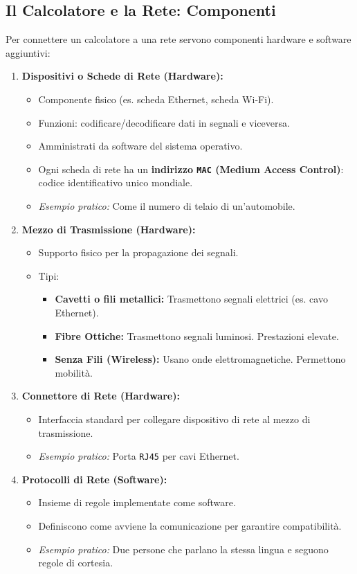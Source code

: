 \documentclass{article}
\begin{document}
\subsection{Il Calcolatore e la Rete: Componenti}
Per connettere un calcolatore a una rete servono componenti hardware e software aggiuntivi:
\begin{enumerate}
    \item \textbf{Dispositivi o Schede di Rete (Hardware):}
    \begin{itemize}
        \item Componente fisico (es. scheda Ethernet, scheda Wi-Fi).
        \item Funzioni: codificare/decodificare dati in segnali e viceversa.
        \item Amministrati da software del sistema operativo.
        \item Ogni scheda di rete ha un \textbf{indirizzo \texttt{MAC} (Medium Access Control)}: codice identificativo unico mondiale.
        \item \textit{Esempio pratico:} Come il numero di telaio di un'automobile.
    \end{itemize}
    \item \textbf{Mezzo di Trasmissione (Hardware):}
    \begin{itemize}
        \item Supporto fisico per la propagazione dei segnali.
        \item Tipi:
        \begin{itemize}
            \item \textbf{Cavetti o fili metallici:} Trasmettono segnali elettrici (es. cavo Ethernet).
            \item \textbf{Fibre Ottiche:} Trasmettono segnali luminosi. Prestazioni elevate.
            \item \textbf{Senza Fili (Wireless):} Usano onde elettromagnetiche. Permettono mobilità.
        \end{itemize}
    \end{itemize}
    \item \textbf{Connettore di Rete (Hardware):}
    \begin{itemize}
        \item Interfaccia standard per collegare dispositivo di rete al mezzo di trasmissione.
        \item \textit{Esempio pratico:} Porta \texttt{RJ45} per cavi Ethernet.
    \end{itemize}
    \item \textbf{Protocolli di Rete (Software):}
    \begin{itemize}
        \item Insieme di regole implementate come software.
        \item Definiscono come avviene la comunicazione per garantire compatibilità.
        \item \textit{Esempio pratico:} Due persone che parlano la stessa lingua e seguono regole di cortesia.
    \end{itemize}
\end{enumerate}
\end{document}
